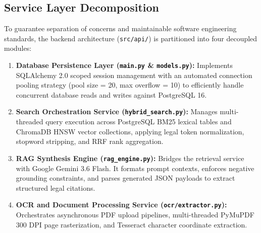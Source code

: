 \documentclass[12pt,a4paper]{report}
\begin{document}
\subsection{Service Layer Decomposition}
To guarantee separation of concerns and maintainable software engineering standards, the backend architecture (\texttt{src/api/}) is partitioned into four decoupled modules:
\begin{enumerate}[leftmargin=20pt, itemsep=3pt]
    \item \textbf{Database Persistence Layer (\texttt{main.py} \& \texttt{models.py}):} Implements SQLAlchemy 2.0 scoped session management with an automated connection pooling strategy (pool size = 20, max overflow = 10) to efficiently handle concurrent database reads and writes against PostgreSQL 16.
    \item \textbf{Search Orchestration Service (\texttt{hybrid\_search.py}):} Manages multi-threaded query execution across PostgreSQL BM25 lexical tables and ChromaDB HNSW vector collections, applying legal token normalization, stopword stripping, and RRF rank aggregation.
    \item \textbf{RAG Synthesis Engine (\texttt{rag\_engine.py}):} Bridges the retrieval service with Google Gemini 3.6 Flash. It formats prompt contexts, enforces negative grounding constraints, and parses generated JSON payloads to extract structured legal citations.
    \item \textbf{OCR and Document Processing Service (\texttt{ocr/extractor.py}):} Orchestrates asynchronous PDF upload pipelines, multi-threaded PyMuPDF 300 DPI page rasterization, and Tesseract character coordinate extraction.
\end{enumerate}
\end{document}
